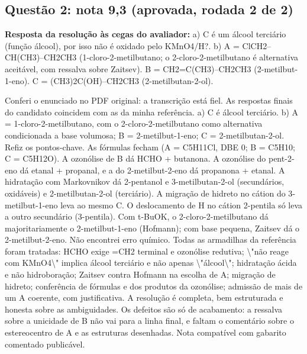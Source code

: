 \documentclass{article}%
\begin{document}
\subsection*{Questão 2: nota 9,3 (aprovada, rodada 2 de 2)}%
\textbf{Resposta da resolução às cegas do avaliador:} a) C é um álcool terciário (função álcool), por isso não é oxidado pelo KMnO4/H?.\newline%
b) A = ClCH2--CH(CH3)--CH2CH3 (1{-}cloro{-}2{-}metilbutano; o 2{-}cloro{-}2{-}metilbutano é alternativa aceitável, com ressalva sobre Zaitsev). B = CH2=C(CH3)--CH2CH3 (2{-}metilbut{-}1{-}eno). C = (CH3)2C(OH)--CH2CH3 (2{-}metilbutan{-}2{-}ol).\par %
Conferi o enunciado no PDF original: a transcrição está fiel. As respostas finais do candidato coincidem com as da minha referência. a) C é álcool terciário. b) A = 1{-}cloro{-}2{-}metilbutano, com o 2{-}cloro{-}2{-}metilbutano como alternativa condicionada a base volumosa; B = 2{-}metilbut{-}1{-}eno; C = 2{-}metilbutan{-}2{-}ol. Refiz os pontos{-}chave. As fórmulas fecham (A = C5H11Cl, DBE 0; B = C5H10; C = C5H12O). A ozonólise de B dá HCHO + butanona. A ozonólise do pent{-}2{-}eno dá etanal + propanal, e a do 2{-}metilbut{-}2{-}eno dá propanona + etanal. A hidratação com Markovnikov dá 2{-}pentanol e 3{-}metilbutan{-}2{-}ol (secundários, oxidáveis) e 2{-}metilbutan{-}2{-}ol (terciário). A migração de hidreto no cátion do 3{-}metilbut{-}1{-}eno leva ao mesmo C. O deslocamento de H no cátion 2{-}pentila só leva a outro secundário (3{-}pentila). Com t{-}BuOK, o 2{-}cloro{-}2{-}metilbutano dá majoritariamente o 2{-}metilbut{-}1{-}eno (Hofmann); com base pequena, Zaitsev dá o 2{-}metilbut{-}2{-}eno. Não encontrei erro químico. Todas as armadilhas da referência foram tratadas: HCHO exige =CH2 terminal e ozonólise redutiva; \textbackslash{}"não reage com KMnO4\textbackslash{}" implica álcool terciário e não apenas \textbackslash{}"álcool\textbackslash{}"; hidratação ácida e não hidroboração; Zaitsev contra Hofmann na escolha de A; migração de hidreto; conferência de fórmulas e dos produtos da ozonólise; admissão de mais de um A coerente, com justificativa. A resolução é completa, bem estruturada e honesta sobre as ambiguidades. Os defeitos são só de acabamento: a ressalva sobre a unicidade de B não vai para a linha final, e faltam o comentário sobre o estereocentro de A e as estruturas desenhadas. Nota compatível com gabarito comentado publicável.%
\end{document}
